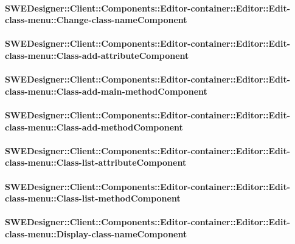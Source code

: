 			\paragraph{SWEDesigner::Client::Components::Editor-container::Editor::Edit-class-menu::Change-class-nameComponent}
				
				
			\paragraph{SWEDesigner::Client::Components::Editor-container::Editor::Edit-class-menu::Class-add-attributeComponent}
				
				
			\paragraph{SWEDesigner::Client::Components::Editor-container::Editor::Edit-class-menu::Class-add-main-methodComponent}
				
				
			\paragraph{SWEDesigner::Client::Components::Editor-container::Editor::Edit-class-menu::Class-add-methodComponent}
				
				
			\paragraph{SWEDesigner::Client::Components::Editor-container::Editor::Edit-class-menu::Class-list-attributeComponent}
				
				
			\paragraph{SWEDesigner::Client::Components::Editor-container::Editor::Edit-class-menu::Class-list-methodComponent}
				
				
			\paragraph{SWEDesigner::Client::Components::Editor-container::Editor::Edit-class-menu::Display-class-nameComponent}
				
		
